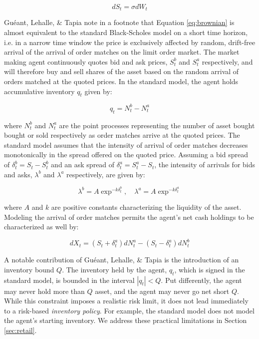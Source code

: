 \documentclass{article}
\begin{document}
\begin{equation}
\label{eq:brownian}
dS_{t} = \sigma dW_{t}
\end{equation}

Guéant, Lehalle, \& Tapia note in a footnote that Equation \ref{eq:brownian} is almost equivalent to the standard Black-Scholes model on a short time horizon, i.e. in a narrow time window the price is exclusively affected by random, drift-free arrival of the arrival of order matches on the limit order market. The market making agent continuously quotes bid and ask prices, $S^b_t$ and $S^a_t$ respectively, and will therefore buy and sell shares of the asset based on the random arrival of orders matched at the quoted prices. In the standard model, the agent holds accumulative inventory $q_t$ given by:

\begin{equation}
\label{eq:inventory}
q_{t} = N^b_{t} - N^a_{t}
\end{equation}

where $N^b_{t}$ and $N^a_{t}$ are the point processes representing the number of asset bought bought or sold respectively as order matches arrive at the quoted prices. The standard model assumes that the intensity of arrival of order matches decreases monotonically in the spread offered on the quoted price. Assuming a bid spread of $\delta^b_t = S_t - S^b_t$ and an ask spread of $\delta^a_t = S^a_t - S_t$, the intensity of arrivals for bids and asks, $\lambda^b$ and $\lambda^a$ respectively, are given by:

\begin{equation}
\label{eq:arrival}
\lambda^b = A \exp^{-k \delta^b_t}, \quad
\lambda^a = A \exp^{-k \delta^a_t}
\end{equation}

where $A$ and $k$ are positive constants characterizing the liquidity of the asset. Modeling the arrival of order matches permits the agent's net cash holdings to be characterized as well by:

\begin{equation}
\label{eq:cash}
dX_t = ( S_t + \delta^a_t ) dN^a_t - ( S_t - \delta^a_t ) dN^b_t
\end{equation}

A notable contribution of Guéant, Lehalle, \& Tapia is the introduction of an inventory bound $Q$. The inventory held by the agent, $q_t$, which is signed in the standard model, is bounded in the interval $|q_t| < Q$. Put differently, the agent may never hold more than $Q$ asset, and the agent may never go net short $Q$. While this constraint imposes a realistic risk limit, it does not lead immediately to a risk-based \emph{inventory policy}. For example, the standard model does not model the agent's starting inventory. We address these practical limitations in Section \ref{sec:retail}.
\end{document}
